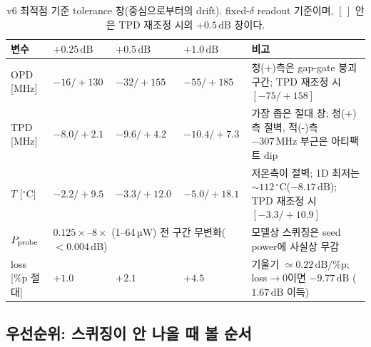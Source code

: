 \documentclass[11pt,a4paper]{article}
\newcommand{\dB}{\,\mathrm{dB}}
\newcommand{\MHz}{\,\mathrm{MHz}}
\newcommand{\degC}{\,^{\circ}\mathrm{C}}
\begin{document}
\begin{table}[t]
\centering
\caption{v6 최적점 기준 tolerance 창(중심으로부터의 drift). fixed-$\delta$
readout 기준이며, $[\,]$ 안은 TPD 재조정 시의 $+0.5\dB$ 창이다.}
\label{tab:tolerance}
\small
\setlength{\tabcolsep}{4pt}
\begin{tabularx}{\textwidth}{>{\raggedright\arraybackslash}Xlll>{\raggedright\arraybackslash}X}
\toprule
변수 & $+0.25\dB$ & $+0.5\dB$ & $+1.0\dB$ & 비고\\
\midrule
OPD [MHz] & $-16/+130$ & $-32/+155$ & $-55/+185$ &
청(+)측은 gap-gate 붕괴 구간; TPD 재조정 시 $[-75/+158]$\\
TPD [MHz] & $-8.0/+2.1$ & $-9.6/+4.2$ & $-10.4/+7.3$ &
가장 좁은 절대 창; 청(+)측 절벽, 적(-)측 $-307\MHz$ 부근은 아티팩트 dip\\
$T$ [$^\circ$C] & $-2.2/+9.5$ & $-3.3/+12.0$ & $-5.0/+18.1$ &
저온측이 절벽; 1D 최저는 $\sim112\degC$($-8.17\dB$); TPD 재조정 시 $[-3.3/+10.9]$\\
$P_{\rm probe}$ & \multicolumn{3}{l}{$0.125\times$--$8\times$ (1--64\,µW) 전 구간 무변화($<0.004\dB$)} &
모델상 스퀴징은 seed power에 사실상 무감\\
loss [\%p 절대] & $+1.0$ & $+2.1$ & $+4.5$ &
기울기 $\simeq0.22\dB/\%$p; loss$\to0$이면 $-9.77\dB$ ($1.67\dB$ 이득)\\
\bottomrule
\end{tabularx}
\end{table}

\subsection*{우선순위: 스퀴징이 안 나올 때 볼 순서}
\end{document}
